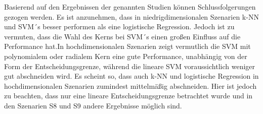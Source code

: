 \documentclass[
]{article}
\begin{document}
Basierend auf den Ergebnissen der genannten Studien können
Schlussfolgerungen gezogen werden. Es ist anzunehmen, dass in
niedrigdimensionalen Szenarien k-NN und SVM´s besser performen als eine
logistische Regression. Jedoch ist zu vermuten, dass die Wahl des Kerns
bei SVM´s einen großen Einfluss auf die Performance hat.\newline In
hochdimensionalen Szenarien zeigt vermutlich die SVM mit polynomialem
oder radialem Kern eine gute Performance, unabhängig von der Form der
Entscheidungsgrenze, während die lineare SVM voraussichtlich weniger gut
abschneiden wird. Es scheint so, dass auch k-NN und logistische
Regression in hochdimensionalen Szenarien zumindest mittelmäßig
abschneiden. Hier ist jedoch zu beachten, dass nur eine lineare
Entscheidungsgrenze betrachtet wurde und in den Szenarien S8 und S9
andere Ergebnisse möglich sind.

\printbibliography
\end{document}
